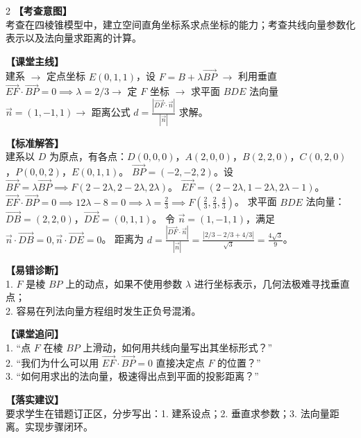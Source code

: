 \documentclass[11pt,a4paper]{ctexart}
\begin{document}
\begin{paracol}{2}
  \textbf{【考查意图】}\\
  考查在四棱锥模型中，建立空间直角坐标系求点坐标的能力；考查共线向量参数化表示以及法向量求距离的计算。
  
  \textbf{【课堂主线】}\\
  建系 $\to$ 定点坐标 $E(0,1,1)$，设 $F = B + \lambda \overrightarrow{BP}$ $\to$ 利用垂直 $\overrightarrow{EF} \cdot \overrightarrow{BP} = 0 \implies \lambda = 2/3 \to$ 定 $F$ 坐标 $\to$ 求平面 $BDE$ 法向量 $\vec{n} = (1,-1,1) \to$ 距离公式 $d = \frac{|\overrightarrow{DF}\cdot\vec{n}|}{|\vec{n}|}$ 求解。
  
  \textbf{【标准解答】}\\
  建系以 $D$ 为原点，有各点：$D(0,0,0)$，$A(2,0,0)$，$B(2,2,0)$，$C(0,2,0)$，$P(0,0,2)$，$E(0,1,1)$。
  $\overrightarrow{BP} = (-2,-2,2)$。设 $\overrightarrow{BF} = \lambda \overrightarrow{BP} \implies F(2-2\lambda, 2-2\lambda, 2\lambda)$。
  $\overrightarrow{EF} = (2-2\lambda, 1-2\lambda, 2\lambda-1)$。
  $\overrightarrow{EF} \cdot \overrightarrow{BP} = 0 \implies 12\lambda - 8 = 0 \implies \lambda = \frac{2}{3} \implies F\left(\frac{2}{3}, \frac{2}{3}, \frac{4}{3}\right)$。
  求平面 $BDE$ 法向量：
  $\overrightarrow{DB} = (2,2,0)$，$\overrightarrow{DE} = (0,1,1)$。
  令 $\vec{n} = (1,-1,1)$，满足 $\vec{n}\cdot\overrightarrow{DB}=0, \vec{n}\cdot\overrightarrow{DE}=0$。
  距离为 $d = \frac{|\overrightarrow{DF} \cdot \vec{n}|}{|\vec{n}|} = \frac{|2/3 - 2/3 + 4/3|}{\sqrt{3}} = \frac{4\sqrt{3}}{9}$。

  \switchcolumn
  \textbf{【易错诊断】}\\
  1. $F$ 是棱 $BP$ 上的动点，如果不使用参数 $\lambda$ 进行坐标表示，几何法极难寻找垂直点；\\
  2. 容易在列法向量方程组时发生正负号混淆。
  
  \textbf{【课堂追问】}\\
  1. “点 $F$ 在棱 $BP$ 上滑动，如何用共线向量写出其坐标形式？”\\
  2. “我们为什么可以用 $\overrightarrow{EF}\cdot\overrightarrow{BP}=0$ 直接决定点 $F$ 的位置？”\\
  3. “如何用求出的法向量，极速得出点到平面的投影距离？”
  
  \textbf{【落实建议】}\\
  要求学生在错题订正区，分步写出：1. 建系设点；2. 垂直求参数；3. 法向量距离。实现步骤闭环。
\end{paracol}

\par\vspace{0.8em}\vspace{0.8em}
\end{document}
